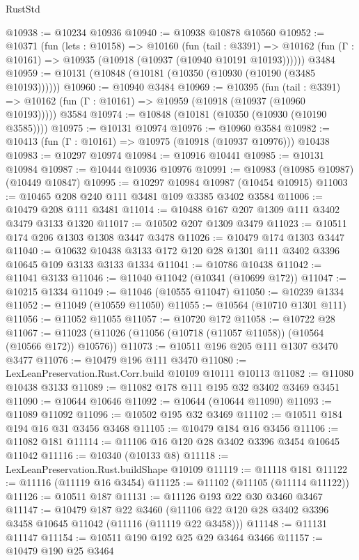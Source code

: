 \begin{lexlean}{RustStd}
\begin{coremodule}
@10938 := @10234 @10936
@10940 := @10938 @10878 @10560
@10952 := @10371
    (fun (lets : @10158) =>
    @10160
      (fun (tail : @3391) =>
      @10162 (fun (Γ : @10161) => @10935 (@10918 (@10937 (@10940 @10191 @10193))))))
    @3484
@10959 := @10131 (@10848 (@10181 (@10350 (@10930 (@10190 (@3485 @10193))))))
@10960 := @10940 @3484
@10969 := @10395
    (fun (tail : @3391) => @10162 (fun (Γ : @10161) => @10959 (@10918 (@10937 (@10960 @10193)))))
    @3584
@10974 := @10848 (@10181 (@10350 (@10930 (@10190 @3585))))
@10975 := @10131 @10974
@10976 := @10960 @3584
@10982 := @10413 (fun (Γ : @10161) => @10975 (@10918 (@10937 @10976))) @10438
@10983 := @10297 @10974
@10984 := @10916 @10441
@10985 := @10131 @10984
@10987 := @10444 @10936 @10976
@10991 := @10983 (@10985 @10987) (@10449 @10847)
@10995 := @10297 @10984 @10987 (@10454 @10915)
@11003 := @10465 @208 @240 @111 @3481 @109 @3385 @3402 @3584
@11006 := @10479 @208 @111 @3481
@11014 := @10488 @167 @207 @1309 @111 @3402 @3479 @3133 @1320
@11017 := @10502 @207 @1309 @3479
@11023 := @10511 @174 @206 @1303 @1308 @3447 @3478
@11026 := @10479 @174 @1303 @3447
@11040 := @10632 @10438 @3133 @172 @120 @28 @1301 @111 @3402 @3396 @10645 @109 @3133 @3133 @1334
@11041 := @10786 @10438
@11042 := @11041 @3133
@11046 := @11040 @11042 (@10341 (@10699 @172))
@11047 := @10215 @1334
@11049 := @11046 (@10555 @11047)
@11050 := @10239 @1334
@11052 := @11049 (@10559 @11050)
@11055 := @10564 (@10710 @1301 @111)
@11056 := @11052 @11055
@11057 := @10720 @172
@11058 := @10722 @28
@11067 := @11023 (@11026 (@11056 (@10718 (@11057 @11058)) (@10564 (@10566 @172)) @10576))
@11073 := @10511 @196 @205 @111 @1307 @3470 @3477
@11076 := @10479 @196 @111 @3470
@11080 := LexLeanPreservation.Rust.Corr.build @10109 @10111 @10113
@11082 := @11080 @10438 @3133
@11089 := @11082 @178 @111 @195 @32 @3402 @3469 @3451
@11090 := @10644 @10646
@11092 := @10644 (@10644 @11090)
@11093 := @11089 @11092
@11096 := @10502 @195 @32 @3469
@11102 := @10511 @184 @194 @16 @31 @3456 @3468
@11105 := @10479 @184 @16 @3456
@11106 := @11082 @181
@11114 := @11106 @16 @120 @28 @3402 @3396 @3454 @10645 @11042
@11116 := @10340 (@10133 @8)
@11118 := LexLeanPreservation.Rust.buildShape @10109
@11119 := @11118 @181
@11122 := @11116 (@11119 @16 @3454)
@11125 := @11102 (@11105 (@11114 @11122))
@11126 := @10511 @187
@11131 := @11126 @193 @22 @30 @3460 @3467
@11147 := @10479
    @187
    @22
    @3460
    (@11106 @22 @120 @28 @3402 @3396 @3458 @10645 @11042 (@11116 (@11119 @22 @3458)))
@11148 := @11131 @11147
@11154 := @10511 @190 @192 @25 @29 @3464 @3466
@11157 := @10479 @190 @25 @3464

\end{coremodule}
\end{lexlean}
